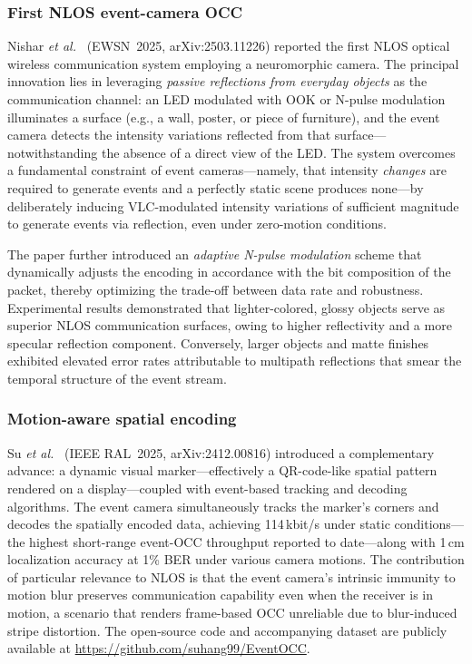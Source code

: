 \documentclass[10pt,a4paper]{article}
\begin{document}
\subsubsection{First NLOS event-camera OCC}
Nishar \emph{et al.}~\cite{nishar2025nlosneuromorphic} (EWSN~2025,
arXiv:2503.11226) reported the first NLOS optical wireless communication
system employing a neuromorphic camera. The principal innovation lies
in leveraging \emph{passive reflections from everyday objects} as the
communication channel: an LED modulated with OOK or N-pulse modulation
illuminates a surface (e.g., a wall, poster, or piece of furniture), and
the event camera detects the intensity variations reflected from that
surface---notwithstanding the absence of a direct view of the LED. The
system overcomes a fundamental constraint of event cameras---namely,
that intensity \emph{changes} are required to generate events and a
perfectly static scene produces none---by deliberately inducing
VLC-modulated intensity variations of sufficient magnitude to generate
events via reflection, even under zero-motion conditions.

The paper further introduced an \emph{adaptive N-pulse modulation}
scheme that dynamically adjusts the encoding in accordance with the bit
composition of the packet, thereby optimizing the trade-off between data
rate and robustness. Experimental results demonstrated that
lighter-colored, glossy objects serve as superior NLOS communication
surfaces, owing to higher reflectivity and a more specular reflection
component. Conversely, larger objects and matte finishes exhibited
elevated error rates attributable to multipath reflections that smear
the temporal structure of the event stream.

\subsubsection{Motion-aware spatial encoding}
Su \emph{et al.}~\cite{su2025motionaware} (IEEE RAL~2025,
arXiv:2412.00816) introduced a complementary advance: a dynamic visual
marker---effectively a QR-code-like spatial pattern rendered on a
display---coupled with event-based tracking and decoding algorithms. The
event camera simultaneously tracks the marker's corners and decodes the
spatially encoded data, achieving 114\,kbit/s under static
conditions---the highest short-range event-OCC throughput reported to
date---along with 1\,cm localization accuracy at 1\% BER under various
camera motions. The contribution of particular relevance to NLOS is
that the event camera's intrinsic immunity to motion blur preserves
communication capability even when the receiver is in motion, a scenario
that renders frame-based OCC unreliable due to blur-induced stripe
distortion. The open-source code and accompanying dataset are publicly
available at \url{https://github.com/suhang99/EventOCC}.
\end{document}
